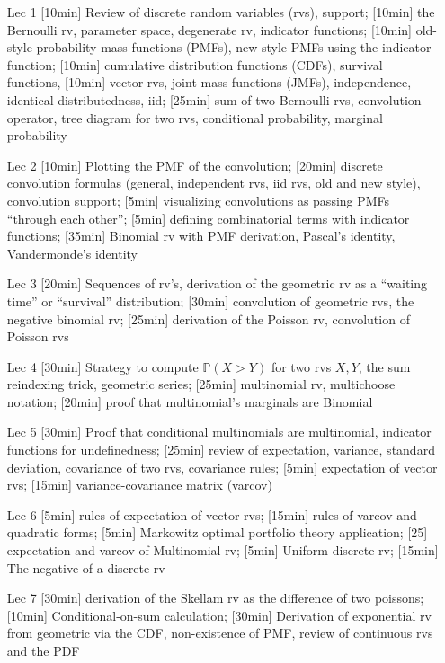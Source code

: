 \documentclass[12pt]{article}
\newcommand{\qu}[1]{``#1''}
\begin{document}
\begin{enumerate}
\item[Lec 1] [10min] Review of discrete random variables (rvs), support; [10min] the Bernoulli rv, parameter space, degenerate rv, indicator functions; [10min] old-style probability mass functions (PMFs), new-style PMFs using the indicator function; [10min] cumulative distribution functions (CDFs), survival functions, [10min] vector rvs, joint mass functions (JMFs), independence, identical distributedness, iid; [25min] sum of two Bernoulli rvs, convolution operator, tree diagram for two rvs, conditional probability, marginal probability

\item[Lec 2] [10min] Plotting the PMF of the convolution; [20min] discrete convolution formulas (general, independent rvs, iid rvs, old and new style), convolution support; [5min] visualizing convolutions as passing PMFs \qu{through each other}; [5min] defining combinatorial terms with indicator functions; [35min] Binomial rv with PMF derivation, Pascal's identity, Vandermonde's identity

\item[Lec 3] [20min] Sequences of rv's, derivation of the geometric rv as a \qu{waiting time} or \qu{survival} distribution; [30min] convolution of geometric rvs, the negative binomial rv; [25min] derivation of the Poisson rv, convolution of Poisson rvs

\item[Lec 4] [30min] Strategy to compute $\mathbb{P}(X > Y)$ for two rvs $X, Y$, the sum reindexing trick, geometric series; [25min] multinomial rv, multichoose notation; [20min] proof that multinomial's marginals are Binomial 

\item[Lec 5] [30min] Proof that conditional multinomials are multinomial, indicator functions for undefinedness; [25min] review of expectation, variance, standard deviation, covariance of two rvs, covariance rules; [5min] expectation of vector rvs; [15min] variance-covariance matrix (varcov)

\item[Lec 6] [5min] rules of expectation of vector rvs; [15min] rules of varcov and quadratic forms; [5min] Markowitz optimal portfolio theory application; [25] expectation and varcov of Multinomial rv; [5min] Uniform discrete rv; [15min] The negative of a discrete rv

\item[Lec 7] [30min] derivation of the Skellam rv as the difference of two poissons; [10min] Conditional-on-sum calculation; [30min] Derivation of exponential rv from geometric via the CDF, non-existence of PMF, review of continuous rvs and the PDF


\end{enumerate}
\end{document}
